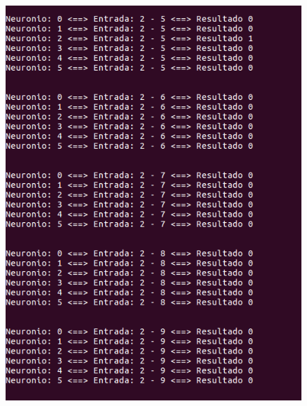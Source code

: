 \documentclass[hidelinks,12pt]{article}
\begin{document}
		\begin{figure}[!h]
			\centering
			\includegraphics[scale=0.5]{Figures/E3S2P2R.png}
		\end{figure}
		
\end{document}
